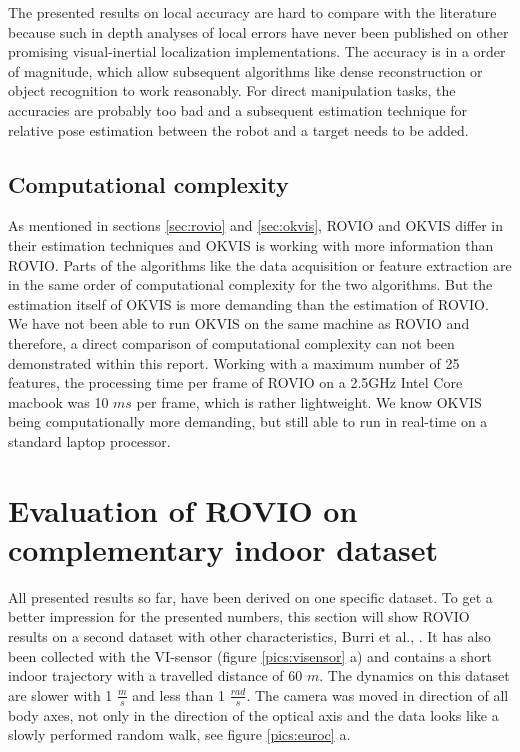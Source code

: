 The presented results on local accuracy are hard to compare with the literature because such in depth analyses of local errors have never been published on other promising visual-inertial localization implementations. The accuracy is in a order of magnitude, which allow subsequent algorithms like dense reconstruction or object recognition to work reasonably. For direct manipulation tasks, the accuracies are probably too bad and a subsequent estimation technique for relative pose estimation between the robot and a target needs to be added.


\subsection{Computational complexity}
\label{sec:ijrr_complexity}

As mentioned in sections \ref{sec:rovio} and \ref{sec:okvis}, ROVIO and OKVIS differ in their estimation techniques and OKVIS is working with more information than ROVIO. Parts of the algorithms like the data acquisition or feature extraction are in the same order of computational complexity for the two algorithms. But the estimation itself of OKVIS is more demanding than the estimation of ROVIO. We have not been able to run OKVIS on the same machine as ROVIO and therefore, a direct comparison of computational complexity can not been demonstrated within this report. Working with a maximum number of 25 features, the processing time per frame of ROVIO on a 2.5GHz Intel Core macbook was 10 $ms$ per frame, which is rather lightweight. We know OKVIS being computationally more demanding, but still able to run in real-time on a standard laptop processor.


\section{Evaluation of ROVIO on complementary indoor dataset}
\label{sec:euroc}

All presented results so far, have been derived on one specific dataset. To get a better impression for the presented numbers, this section will show ROVIO results on a second dataset with other characteristics, Burri et al., \cite{burri2015euroc}. It has also been collected with the VI-sensor (figure \ref{pics:visensor} a) and contains a short indoor trajectory with a travelled distance of 60 $m$. The dynamics on this dataset are slower with 1 $\frac{m}{s}$ and less than 1 $\frac{rad}{s}$. The camera was moved in direction of all body axes, not only in the direction of the optical axis and the data looks like a slowly performed random walk, see figure \ref{pics:euroc} a. \\

